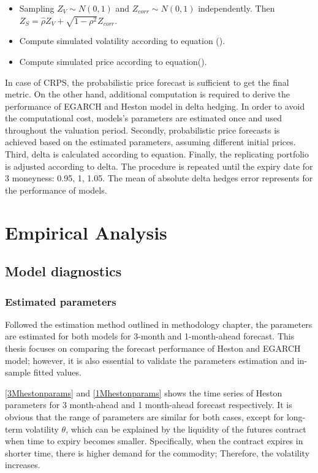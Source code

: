 \documentclass[12pt,a4paper]{article}
\newcommand\colorAutoref[1]{{\hypersetup{linkcolor=black}\autoref{#1}}}
\numberwithin{equation}{section}
\begin{document}
\begin{itemize}
\item Sampling $Z_V \sim N(0,1)$ and $Z_{corr} \sim N(0,1)$ independently. Then $Z_S = \hat{\rho} Z_V + \sqrt{1-\rho^2} Z_{corr}$.
\item Compute simulated volatility according to equation ().
\item Compute simulated price according to equation().
\end{itemize}

In case of CRPS, the probabilistic price forecast is sufficient to get the final metric. On the other hand, additional computation is required to derive the performance of EGARCH and Heston model in delta hedging. In order to avoid the computational cost, models's parameters are estimated once and used throughout the valuation period. Secondly, probabilistic price forecasts is achieved based on the estimated parameters, assuming different initial prices. Third, delta is calculated according to equation. Finally, the replicating portfolio is adjusted according to delta. The procedure is repeated until the expiry date for 3 moneyness: 0.95, 1, 1.05. The mean of absolute delta hedges error represents for the performance of models.


\section{Empirical Analysis}

\subsection{Model diagnostics}

\subsubsection{Estimated parameters}

Followed the estimation method outlined in methodology chapter, the parameters are estimated for both models for 3-month and 1-month-ahead forecast. This thesis focuses on comparing the forecast performance of Heston and EGARCH model; however, it is also essential to validate the parameters estimation and in-sample fitted values.

 \colorAutoref{3Mhestonparams} and  \colorAutoref{1Mhestonparams} shows the time series of Heston parameters for 3 month-ahead and 1 month-ahead forecast respectively. It is obvious that the range of parameters are similar for both cases, except for long-term volatility $\theta$, which can be explained by the liquidity of the futures contract when time to expiry becomes smaller. Specifically, when the contract expires in shorter time, there is higher demand for the commodity; Therefore, the volatility increases. 
\end{document}
